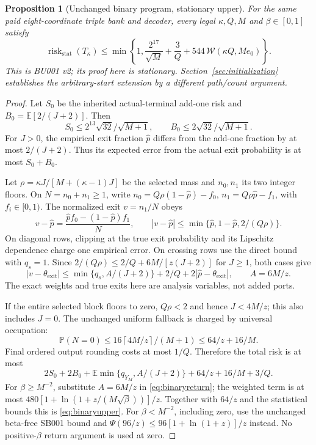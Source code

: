 \documentclass[11pt,letterpaper]{article}
\newtheorem{proposition}[theorem]{Proposition}
\theoremstyle{definition}\newtheorem{definition}[theorem]{Definition}
\theoremstyle{remark}\newtheorem{remark}[theorem]{Remark}
\newcommand{\E}{\mathbb{E}}
\newcommand{\Prob}{\mathbb{P}}
\newcommand{\ceil}[1]{\left\lceil #1\right\rceil}
\newcommand{\unit}[1]{\textsf{#1}}
\begin{document}
\begin{proposition}[Unchanged binary program, stationary upper]\label{prop:binaryupper}
For the same paid eight-coordinate triple bank and decoder, every legal $\kappa,Q,M$ and $\beta\in[0,1]$ satisfy
\begin{equation}\label{eq:binaryupper}
 \operatorname{risk}_{\mathrm{stat}}(T_\kappa)
 \le\min\left\{1,\frac{2^{17}}{\sqrt M}+\frac3Q+
 544\,\mathcal W(\kappa Q,Me_0)\right\}.
\end{equation}
This is \unit{BU001 v2}; its proof here is stationary. Section~\ref{sec:initialization} establishes the arbitrary-start extension by a different path/count argument.
\end{proposition}
\begin{proof}
Let $S_0$ be the inherited actual-terminal add-one risk and
$B_0=\E[2/(J+2)]$. Then
\[
 S_0\le2^{13}\sqrt{32}/\sqrt{M+1},\qquad
 B_0\le2\sqrt{32}/\sqrt{M+1}.
\]
For $J>0$, the empirical exit fraction $\widehat p$ differs from the add-one fraction by at most $2/(J+2)$. Thus its expected error from the actual exit probability is at most $S_0+B_0$.

Let $\rho=\kappa J/[M+(\kappa-1)J]$ be the selected mass and $n_0,n_1$ its two integer floors. On $N=n_0+n_1\ge1$, write
$n_0=Q\rho(1-\widehat p)-f_0$,
$n_1=Q\rho\widehat p-f_1$, with $f_i\in[0,1)$.
The normalized exit $v=n_1/N$ obeys
\[
 v-\widehat p=
 \frac{\widehat p f_0-(1-\widehat p)f_1}{N},\qquad
 |v-\widehat p|
 \le\min\{\widehat p,1-\widehat p,2/(Q\rho)\}.
\]
On diagonal rows, clipping at the true exit probability and its Lipschitz dependence charge one empirical error. On crossing rows use the direct bound with $q_s=1$. Since
$2/(Q\rho)\le2/Q+6M/[z(J+2)]$ for $J\ge1$, both cases give
\[
 |v-\theta_{\mathrm{exit}}|
 \le\min\{q_s,A/(J+2)\}+2/Q
       +2|\widehat p-\theta_{\mathrm{exit}}|,\qquad A=6M/z.
\]
The exact weights and true exits here are analysis variables, not added ports.

If the entire selected block floors to zero, $Q\rho<2$ and hence $J<4M/z$; this also includes $J=0$. The unchanged uniform fallback is charged by universal occupation:
\[
 \Prob(N=0)\le16\ceil{4M/z}/(M+1)\le64/z+16/M.
\]
Final ordered output rounding costs at most $1/Q$. Therefore the total risk is at most
\[
 2S_0+2B_0+\E\min\{q_{Y_M},A/(J+2)\}
       +64/z+16/M+3/Q.
\]
For $\beta\ge M^{-2}$, substitute $A=6M/z$ in
\eqref{eq:binaryreturn}; the weighted term is at most
$480[1+\ln(1+z/(M\sqrt\beta))]/z$.
Together with $64/z$ and the statistical bounds this is
\eqref{eq:binaryupper}. For $\beta<M^{-2}$, including zero, use the unchanged beta-free SB001 bound and
$\Psi(96/z)\le96[1+\ln(1+z)]/z$ instead. No positive-$\beta$ return argument is used at zero.
\end{proof}
\end{document}
